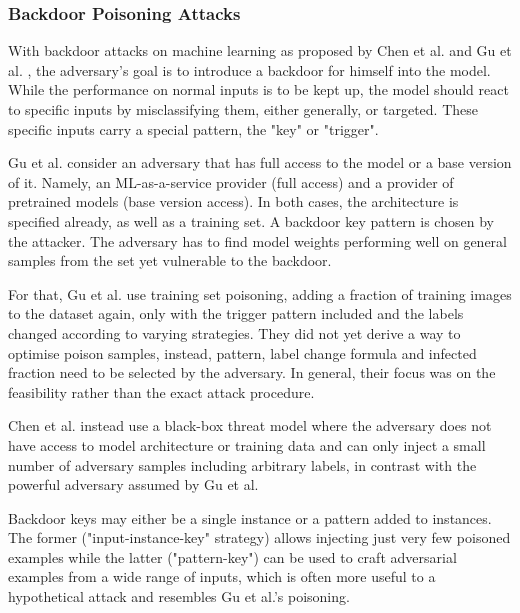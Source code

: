 \documentclass[review]{AIM_report}
\begin{document}
\subsubsection{Backdoor Poisoning Attacks}
With backdoor attacks on machine learning as proposed by Chen et al. \cite{chen2017targeted} %
and Gu et al. \cite{gu2017badnets}, the adversary's goal is to introduce a backdoor for himself into the model. While the performance on normal inputs is to be kept up, the model should react to specific inputs by misclassifying them, either generally, or targeted. These specific inputs carry a special pattern, the "key" or "trigger".

Gu et al. consider an adversary that has full access to the model or a base version of it. Namely, an ML-as-a-service provider (full access) and a provider of pretrained models (base version access). In both cases, the architecture is specified already, as well as a training set. A backdoor key pattern is chosen by the attacker. The adversary has to find model weights performing well on general samples from the set yet vulnerable to the backdoor.

For that, Gu et al. use training set poisoning, adding a fraction of training images to the dataset again, only with the trigger pattern included and the labels changed according to varying strategies. They did not yet derive a way to optimise poison samples, instead, pattern, label change formula and infected fraction need to be selected by the adversary. In general, their focus was on the feasibility rather than the exact attack procedure.

Chen et al. instead use a black-box threat model where the adversary does not have access to model architecture or training data and can only inject a small number of adversary samples including arbitrary labels, in contrast with the powerful adversary assumed by Gu et al. 

Backdoor keys may either be a single instance or a pattern added to instances. The former ("input-instance-key" strategy) allows injecting just very few poisoned examples while the latter ("pattern-key") can be used to craft adversarial examples from a wide range of inputs, which is often more useful to a hypothetical attack and resembles Gu et al.'s poisoning. 
\end{document}
